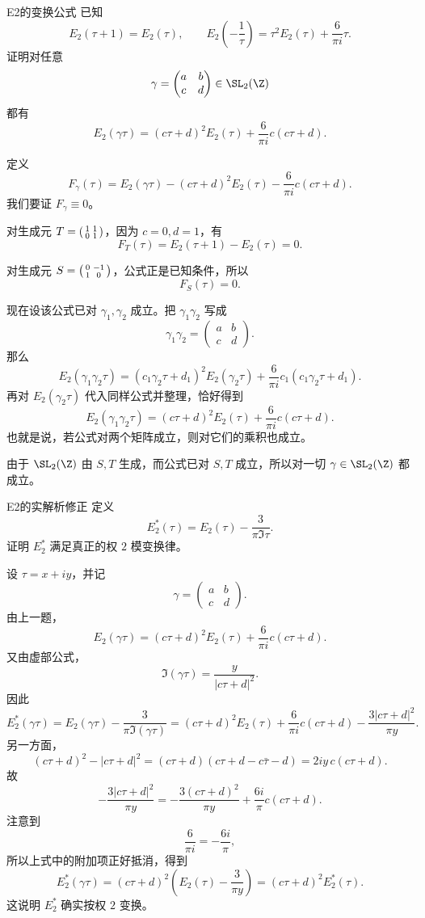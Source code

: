 \begin{problem}{E2的变换公式}
\medium
已知
\[
E_2(\tau+1)=E_2(\tau),
\qquad
E_2\!\left(-\frac1\tau\right)=\tau^2E_2(\tau)+\frac{6}{\pi i}\tau.
\]
证明对任意
\[
\gamma=\begin{pmatrix}a&b\\c&d\end{pmatrix}\in\SL_2(\Z)
\]
都有
\[
E_2(\gamma\tau)=(c\tau+d)^2E_2(\tau)+\frac{6}{\pi i}c(c\tau+d).
\]
\end{problem}
\begin{solution}
定义
\[
F_\gamma(\tau)=E_2(\gamma\tau)-(c\tau+d)^2E_2(\tau)-\frac{6}{\pi i}c(c\tau+d).
\]
我们要证 $F_\gamma\equiv 0$。

对生成元 $T=\begin{psmallmatrix}1&1\\0&1\end{psmallmatrix}$，因为 $c=0,d=1$，有
\[
F_T(\tau)=E_2(\tau+1)-E_2(\tau)=0.
\]

对生成元 $S=\begin{psmallmatrix}0&-1\\1&0\end{psmallmatrix}$，公式正是已知条件，所以
\[
F_S(\tau)=0.
\]

现在设该公式已对 $\gamma_1,\gamma_2$ 成立。把 $\gamma_1\gamma_2$ 写成
\[
\gamma_1\gamma_2=
\begin{pmatrix}a&b\\c&d\end{pmatrix}.
\]
那么
\[
E_2(\gamma_1\gamma_2\tau)
= (c_1\gamma_2\tau+d_1)^2E_2(\gamma_2\tau)+\frac{6}{\pi i}c_1(c_1\gamma_2\tau+d_1).
\]
再对 $E_2(\gamma_2\tau)$ 代入同样公式并整理，恰好得到
\[
E_2(\gamma_1\gamma_2\tau)=(c\tau+d)^2E_2(\tau)+\frac{6}{\pi i}c(c\tau+d).
\]
也就是说，若公式对两个矩阵成立，则对它们的乘积也成立。

由于 $\SL_2(\Z)$ 由 $S,T$ 生成，而公式已对 $S,T$ 成立，所以对一切 $\gamma\in\SL_2(\Z)$ 都成立。
\end{solution}

\begin{problem}{E2的实解析修正}
\medium
定义
\[
E_2^*(\tau)=E_2(\tau)-\frac{3}{\pi\Im\tau}.
\]
证明 $E_2^*$ 满足真正的权 $2$ 模变换律。
\end{problem}
\begin{solution}
设 $\tau=x+iy$，并记
\[
\gamma=\begin{pmatrix}a&b\\c&d\end{pmatrix}.
\]
由上一题，
\[
E_2(\gamma\tau)=(c\tau+d)^2E_2(\tau)+\frac{6}{\pi i}c(c\tau+d).
\]
又由虚部公式，
\[
\Im(\gamma\tau)=\frac{y}{|c\tau+d|^2}.
\]
因此
\[
E_2^*(\gamma\tau)
=E_2(\gamma\tau)-\frac{3}{\pi\Im(\gamma\tau)}
=(c\tau+d)^2E_2(\tau)+\frac{6}{\pi i}c(c\tau+d)-\frac{3|c\tau+d|^2}{\pi y}.
\]
另一方面，
\[
(c\tau+d)^2-|c\tau+d|^2=(c\tau+d)(c\tau+d-c\bar\tau-d)=2iy\,c(c\tau+d).
\]
故
\[
-\frac{3|c\tau+d|^2}{\pi y}
=-\frac{3(c\tau+d)^2}{\pi y}+\frac{6i}{\pi}c(c\tau+d).
\]
注意到
\[
\frac{6}{\pi i}=-\frac{6i}{\pi},
\]
所以上式中的附加项正好抵消，得到
\[
E_2^*(\gamma\tau)=(c\tau+d)^2\left(E_2(\tau)-\frac{3}{\pi y}\right)
=(c\tau+d)^2E_2^*(\tau).
\]
这说明 $E_2^*$ 确实按权 $2$ 变换。
\end{solution}

